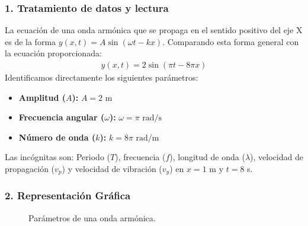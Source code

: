 \subsubsection*{1. Tratamiento de datos y lectura}
La ecuación de una onda armónica que se propaga en el sentido positivo del eje X es de la forma $y(x,t) = A \sin(\omega t - kx)$. Comparando esta forma general con la ecuación proporcionada:
\begin{gather}
    y(x,t) = 2 \sin(\pi t - 8\pi x)
\end{gather}
Identificamos directamente los siguientes parámetros:
\begin{itemize}
    \item \textbf{Amplitud ($A$):} $A = 2 \text{ m}$
    \item \textbf{Frecuencia angular ($\omega$):} $\omega = \pi \text{ rad/s}$
    \item \textbf{Número de onda ($k$):} $k = 8\pi \text{ rad/m}$
\end{itemize}
Las incógnitas son: Periodo ($T$), frecuencia ($f$), longitud de onda ($\lambda$), velocidad de propagación ($v_p$) y velocidad de vibración ($v_y$) en $x=1$ m y $t=8$ s.

\subsubsection*{2. Representación Gráfica}
\begin{figure}[H]
    \centering
    \caption{Parámetros de una onda armónica.}
\end{figure}


